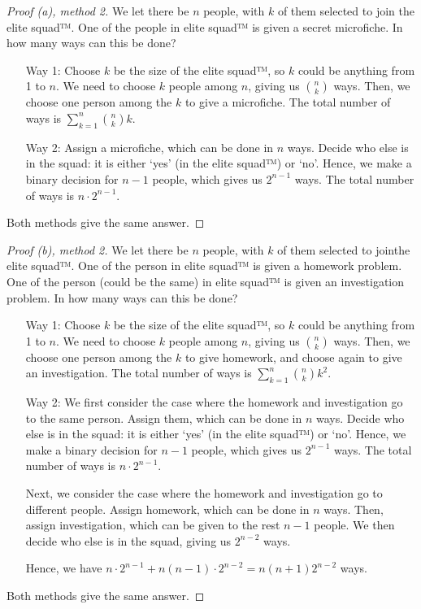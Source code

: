\documentclass[12pt]{article}
\begin{document}
\begin{proof}[Proof (a), method 2]
    We let there be $n$ people, with $k$ of them selected to join the  elite squad™. One of the people in elite squad™ is given a secret microfiche. In how many ways can this be done?

    \begin{itemize}[align=left]
        \item[Way 1:] Choose $k$ be the size of the elite squad™, so $k$ could be anything from 1 to $n$. We need to choose $k$ people among $n$, giving us $n\choose k$ ways. Then, we choose one person among the $k$ to give a microfiche. The total number of ways is $\sum_{k=1}^{n}{n\choose k}k$.
        \item[Way 2:] Assign a microfiche, which can be done in $n$ ways. Decide who else is in the squad: it is either `yes' (in the elite squad™) or `no'. Hence, we make a binary decision for $n-1$ people, which gives us $2^{n-1}$ ways. The total number of ways is $n\cdot 2^{n-1}$.
    \end{itemize}
    Both methods give the same answer.
\end{proof}
\begin{proof}[Proof (b), method 2]
    We let there be $n$ people, with $k$ of them selected to jointhe  elite squad™. One of the person in elite squad™ is given a homework problem. One of the person (could be the same) in elite squad™ is given an investigation problem. In how many ways can this be done?

    \begin{itemize}[align=left]
        \item[Way 1:] Choose $k$ be the size of the elite squad™, so $k$ could be anything from 1 to $n$. We need to choose $k$ people among $n$, giving us $n\choose k$ ways. Then, we choose one person among the $k$ to give homework, and choose again to give an investigation. The total number of ways is $\sum_{k=1}^{n}{n\choose k}k^2$.
        \item[Way 2:] We first consider the case where the homework and investigation go to the same person. Assign them, which can be done in $n$ ways. Decide who else is in the squad: it is either `yes' (in the elite squad™) or `no'. Hence, we make a binary decision for $n-1$ people, which gives us $2^{n-1}$ ways. The total number of ways is $n\cdot 2^{n-1}$.
        
        Next, we consider the case where the homework and investigation go to different people. Assign homework, which can be done in $n$ ways. Then, assign investigation, which can be given to the rest $n-1$ people. We then decide who else is in the squad, giving us $2^{n-2}$ ways.

        Hence, we have \(n\cdot 2^{n-1}+ n(n-1)\cdot 2^{n-2}= n(n+1)2^{n-2}\) ways.
    \end{itemize}
    Both methods give the same answer.
\end{proof}
\end{document}
